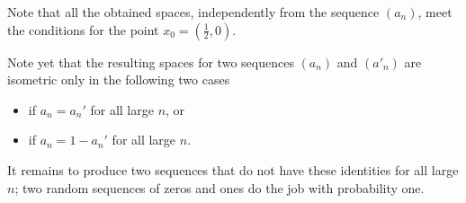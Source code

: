 Note that all the obtained spaces, independently from the sequence $(a_n)$, meet the conditions for the point $x_0=(\tfrac12,0)$.

Note yet that the resulting spaces for two sequences $(a_n)$ and $(a'_n)$ are isometric only in the following two cases 
\begin{itemize}
\item if $a_n=a_n'$ for all large $n$, or
\item if $a_n=1-a_n'$  for all large $n$.
\end{itemize}

It remains to produce two sequences that do not have these identities for all large $n$; 
two random sequences of zeros and ones do the job with probability one.\qeds